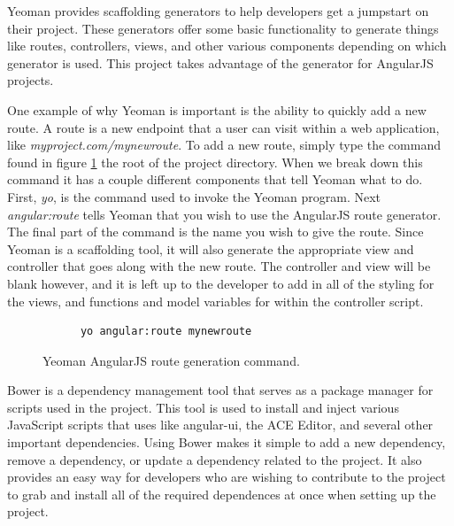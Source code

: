 Yeoman provides scaffolding generators to help developers get a jumpstart on their project. These generators offer some basic functionality to generate things like routes, controllers, views, and other various components depending on which generator is used. This project takes advantage of the generator for AngularJS projects.

One example of why Yeoman is important is the ability to quickly add a new route. A route is a new endpoint that a user can visit within a web application, like \emph{myproject.com/mynewroute}. To add a new route, simply type the command found in figure \ref{yeomanAngularFig} the root of the project directory. When we break down this command it has a couple different components that tell Yeoman what to do. First, \emph{yo}, is the command used to invoke the Yeoman program. Next \emph{angular:route} tells Yeoman that you wish to use the AngularJS route generator. The final part of the command is the name you wish to give the route. Since Yeoman is a scaffolding tool, it will also generate the appropriate view and controller that goes along with the new route. The controller and view will be blank however, and it is left up to the developer to add in all of the styling for the views, and functions and model variables for within the controller script.

\begin{figure}[H]
  \begin{center}
    \renewcommand{\theFancyVerbLine}{
      \sffamily\textcolor[rgb]{0.5,0.5,0.5}{\scriptsize\arabic{FancyVerbLine}}}
    \begin{verbatim}
      yo angular:route mynewroute
    \end{verbatim}

  \end{center}
  \caption{Yeoman AngularJS route generation command.}
  \label{yeomanAngularFig}
\end{figure}

Bower\cite{Note:Bower:2014} is a dependency management tool that serves as a package manager for scripts used in the project. This tool is used to install and inject various JavaScript scripts that \projectName{} uses like angular-ui, the ACE Editor, and several other important dependencies. Using Bower makes it simple to add a new dependency, remove a dependency, or update a dependency related to the project. It also provides an easy way for developers who are wishing to contribute to the project to grab and install all of the required dependences at once when setting up the project.

